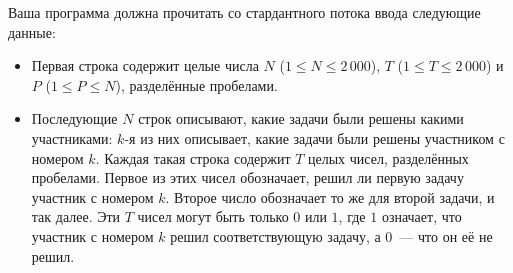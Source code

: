 Ваша программа должна прочитать со стардантного потока ввода следующие данные:
\begin{itemize}
\item Первая строка содержит целые числа $N$ ($1 \le N \le 2\,000$), $T$ ($1 \le T \le 2\,000$) и $P$ ($1 \le P \le N$), разделённые пробелами.
\item Последующие $N$ строк описывают, какие задачи были решены какими участниками: $k$-я из них описывает, какие задачи были решены участником с номером $k$. Каждая такая строка содержит $T$ целых чисел, разделённых пробелами. Первое из этих чисел обозначает, решил ли первую задачу участник с номером $k$. Второе число обозначает то же для второй задачи, и так далее. Эти $T$ чисел могут быть только $0$ или $1$, где $1$ означает, что участник с номером $k$ решил соответствующую задачу, а $0$~--- что он её не решил.
\end{itemize}
